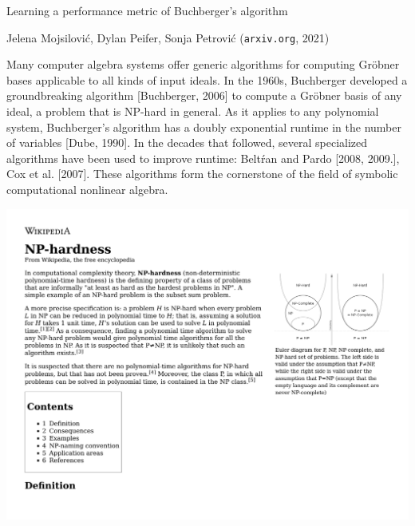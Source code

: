 \documentclass{beamer}
\begin{document}
\begin{frame}

\begin{exampleblock}{Learning a performance metric of Buchberger's algorithm

Jelena Mojsilovi\'c, Dylan Peifer, Sonja Petrovi\'c ({\tt arxiv.org}, 2021)
}
Many computer algebra systems offer generic algorithms for computing Gr\"obner bases
applicable to all kinds of input ideals. In the 1960s, Buchberger developed a groundbreaking
algorithm [Buchberger, 2006] to compute a Gr\"obner basis of any ideal, a problem that is
NP-hard in general. As it applies to any polynomial system, Buchberger's algorithm has a
doubly exponential runtime in the number of variables [Dube, 1990]. In the decades that followed,
several specialized algorithms have been used to improve runtime: Belt\'ran and Pardo
[2008, 2009.], Cox et al. [2007]. These algorithms form the cornerstone of the field of symbolic
computational nonlinear algebra.
\end{exampleblock}

\end{frame}

\begin{frame}
\includegraphics[width=\textwidth]{NP-hardness - Wikipedia.pdf}
\end{frame}
\end{document}
